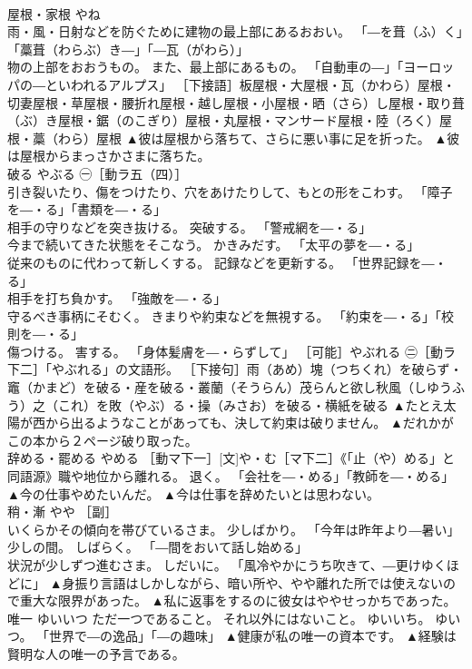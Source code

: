 \documentclass[8pt]{extreport}
\begin{document}
\begin{CJK}{UTF8}{min}
\\	屋根・家根	やね	
\\	雨・風・日射などを防ぐために建物の最上部にあるおおい。 「―を葺（ふ）く」「藁葺（わらぶ）き―」「―瓦（がわら）」 
\\	物の上部をおおうもの。 また、最上部にあるもの。 「自動車の―」「ヨーロッパの―といわれるアルプス」 ［下接語］板屋根・大屋根・瓦（かわら）屋根・切妻屋根・草屋根・腰折れ屋根・越し屋根・小屋根・晒（さら）し屋根・取り葺（ぶ）き屋根・鋸（のこぎり）屋根・丸屋根・マンサード屋根・陸（ろく）屋根・藁（わら）屋根	▲彼は屋根から落ちて、さらに悪い事に足を折った。 ▲彼は屋根からまっさかさまに落ちた。
\\	破る	やぶる	㊀［動ラ五（四）］ 
\\	引き裂いたり、傷をつけたり、穴をあけたりして、もとの形をこわす。 「障子を―・る」「書類を―・る」 
\\	相手の守りなどを突き抜ける。 突破する。 「警戒網を―・る」 
\\	今まで続いてきた状態をそこなう。 かきみだす。 「太平の夢を―・る」 
\\	従来のものに代わって新しくする。 記録などを更新する。 「世界記録を―・る」 
\\	相手を打ち負かす。 「強敵を―・る」 
\\	守るべき事柄にそむく。 きまりや約束などを無視する。 「約束を―・る」「校則を―・る」 
\\	傷つける。 害する。 「身体髪膚を―・らずして」 ［可能］やぶれる ㊁［動ラ下二］「やぶれる」の文語形。 ［下接句］雨（あめ）塊（つちくれ）を破らず・竈（かまど）を破る・産を破る・叢蘭（そうらん）茂らんと欲し秋風（しゆうふう）之（これ）を敗（やぶ）る・操（みさお）を破る・横紙を破る	▲たとえ太陽が西から出るようなことがあっても、決して約束は破りません。 ▲だれかがこの本から２ページ破り取った。
\\	辞める・罷める	やめる	［動マ下一］[文]や・む［マ下二］《「止（や）める」と同語源》職や地位から離れる。 退く。 「会社を―・める」「教師を―・める」	▲今の仕事やめたいんだ。 ▲今は仕事を辞めたいとは思わない。
\\	稍・漸	やや	［副］ 
\\	いくらかその傾向を帯びているさま。 少しばかり。 「今年は昨年より―暑い」 
\\	少しの間。 しばらく。 「―間をおいて話し始める」 
\\	状況が少しずつ進むさま。 しだいに。 「風冷やかにうち吹きて、―更けゆくほどに」	▲身振り言語はしかしながら、暗い所や、やや離れた所では使えないので重大な限界があった。 ▲私に返事をするのに彼女はややせっかちであった。
\\	唯一	ゆいいつ	ただ一つであること。 それ以外にはないこと。 ゆいいち。 ゆいつ。 「世界で―の逸品」「―の趣味」	▲健康が私の唯一の資本です。 ▲経験は賢明な人の唯一の予言である。

\end{CJK}
\end{document}
